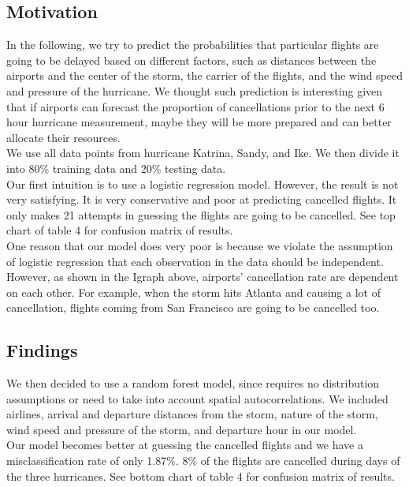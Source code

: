 \subsection{Motivation}
In the following, we try to predict the probabilities that particular flights are going to be delayed based on different factors, such as distances between the airports and the center of the storm, the carrier of the flights, and the wind speed and pressure of the hurricane. We thought such prediction is interesting given that if airports can forecast the proportion of cancellations prior to the next 6 hour hurricane measurement, maybe they will be more prepared and can better allocate their resources. \\

We use all data points from hurricane Katrina, Sandy, and Ike. We then divide it into 80\% training data and 20\% testing data. \\

Our first intuition is to use a logistic regression model. However, the result is not very satisfying. It is very conservative and poor at predicting cancelled flights. It only makes 21 attempts in guessing the flights are going to be cancelled. See top chart of table 4 for confusion matrix of results. \\

One reason that our model does very poor is because we violate the assumption of logistic regression that each observation in the data should be independent. However, as shown in the Igraph above, airports’ cancellation rate are dependent on each other. For example, when the storm hits Atlanta and causing a lot of cancellation, flights coming from San Francisco are going to be cancelled too. \\

\subsection{Findings}
We then decided to use a random forest model, since requires no distribution assumptions or need to take into account spatial autocorrelations. We included airlines, arrival and departure distances from the storm, nature of the storm, wind speed and pressure of the storm, and departure hour in our model. \\

Our model becomes better at guessing the cancelled flights and we have a misclassification rate of only 1.87\%. 8\% of the flights are cancelled during days of the three hurricanes. See bottom chart of table 4 for confusion matrix of results. \\

